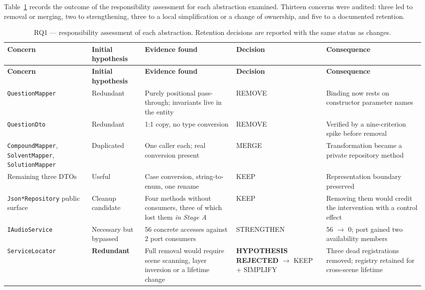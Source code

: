 \documentclass[pdflatex,sn-basic]{sn-jnl}
\begin{document}
Table~\ref{tab:rq1} records the outcome of the responsibility assessment for each abstraction examined. Thirteen concerns were audited: three led to removal or merging, two to strengthening, three to a local simplification or a change of ownership, and five to a documented retention.

\begingroup
\footnotesize
\setlength{\tabcolsep}{4pt}
\begin{longtable}{@{}p{}p{}p{}p{}p{}@{}}
\caption{RQ1 --- responsibility assessment of each abstraction. Retention decisions are reported with the same status as changes.}\label{tab:rq1}\\
\toprule
\textbf{Concern} & \textbf{Initial hypothesis} & \textbf{Evidence found} & \textbf{Decision} & \textbf{Consequence} \\
\midrule
\endfirsthead
\toprule
\textbf{Concern} & \textbf{Initial hypothesis} & \textbf{Evidence found} & \textbf{Decision} & \textbf{Consequence} \\
\midrule
\endhead
\bottomrule
\endlastfoot
\texttt{QuestionMapper} & Redundant & Purely positional pass-through; invariants live in the entity & REMOVE & Binding now rests on constructor parameter names \\
\addlinespace
\texttt{QuestionDto} & Redundant & 1:1 copy, no type conversion & REMOVE & Verified by a nine-criterion spike before removal \\
\addlinespace
\texttt{CompoundMapper}, \texttt{SolventMapper}, \texttt{SolutionMapper} & Duplicated & One caller each; real conversion present & MERGE & Transformation became a private repository method \\
\addlinespace
Remaining three DTOs & Useful & Case conversion, string-to-enum, one rename & KEEP & Representation boundary preserved \\
\addlinespace
\texttt{Json*Repository} public surface & Cleanup candidate & Four methods without consumers, three of which lost them \emph{in Stage A} & KEEP & Removing them would credit the intervention with a control effect \\
\addlinespace
\texttt{IAudioService} & Necessary but bypassed & 56 concrete accesses against 2 port consumers & STRENGTHEN & 56 $\rightarrow$ 0; port gained two availability members \\
\addlinespace
\texttt{ServiceLocator} & \textbf{Redundant} & Full removal would require scene scanning, layer inversion or a lifetime change & \textbf{HYPOTHESIS REJECTED} $\rightarrow$ KEEP + SIMPLIFY & Three dead registrations removed; registry retained for cross-scene lifetime \\

\end{longtable}
\end{document}
